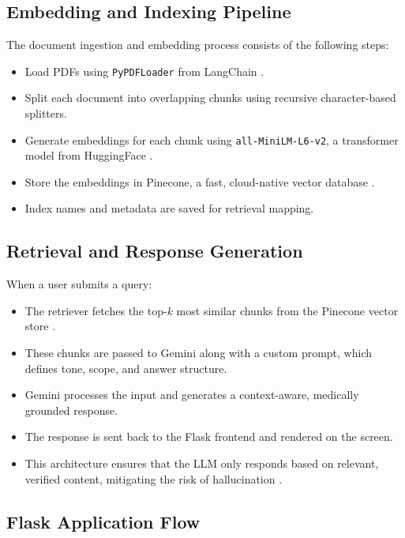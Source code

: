 \documentclass[12pt,a4paper]{report}
\begin{document}
\label{Embedding and Indexing Pipeline}
\subsection{Embedding and Indexing Pipeline}
The document ingestion and embedding process consists of the following steps:
\begin{itemize}
    \item Load PDFs using \texttt{PyPDFLoader} from LangChain \cite{langchain}.
    \item Split each document into overlapping chunks using recursive character-based splitters.
    \item Generate embeddings for each chunk using \texttt{all-MiniLM-L6-v2}, a transformer model from HuggingFace \cite{sentence_transformers}.
    \item Store the embeddings in Pinecone, a fast, cloud-native vector database \cite{pinecone}.
    \item Index names and metadata are saved for retrieval mapping.
\end{itemize}

\label{Retrieval and Response Generation}
\subsection{Retrieval and Response Generation}
When a user submits a query:
\begin{itemize}
    \item The retriever fetches the top-\(k\) most similar chunks from the Pinecone vector store \cite{pinecone}.
    \item These chunks are passed to Gemini along with a custom prompt, which defines tone, scope, and answer structure.
    \item Gemini processes the input and generates a context-aware, medically grounded response.
    \item The response is sent back to the Flask frontend and rendered on the screen.
    \item This architecture ensures that the LLM only responds based on relevant, verified content, mitigating the risk of hallucination \cite{hallucination_survey}.
\end{itemize}

\label{Flask Application Flow}
\subsection{Flask Application Flow}
\end{document}
